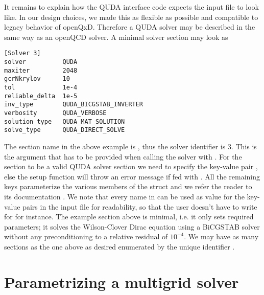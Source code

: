 It remains to explain how the QUDA interface code expects the input file to look like. In our design choices, we made this as flexible as possible and compatible to legacy behavior of openQxD. Therefore a QUDA solver may be described in the same way as an openQCD solver. A minimal solver section may look as
\begin{verbatim}
[Solver 3]
solver          QUDA
maxiter         2048
gcrNkrylov      10
tol             1e-4
reliable_delta  1e-5
inv_type        QUDA_BICGSTAB_INVERTER
verbosity       QUDA_VERBOSE
solution_type   QUDA_MAT_SOLUTION
solve_type      QUDA_DIRECT_SOLVE
\end{verbatim}
The section name in the above example is , thus the solver identifier is 3. This is the argument  that has to be provided when calling the solver with . For the section to be a valid QUDA solver section we need to specify the key-value pair , else the setup function will throw an error message if fed with . All the remaining keys parameterize the various members of the  struct and we refer the reader to its documentation \cite{QUDApaper,github:quda}. We note that every name in  can be used as value for the key-value pairs in the input file for readability, so that the user doesn't have to write  for  for instance. The example section above is minimal, i.e. it only sets required parameters; it solves the Wilson-Clover Dirac equation using a BiCGSTAB solver without any preconditioning to a relative residual of $10^{-4}$. We may have as many sections as the one above as desired enumerated by the unique identifier .

\section{Parametrizing a multigrid solver}
\label{sec:running:multgrid}

